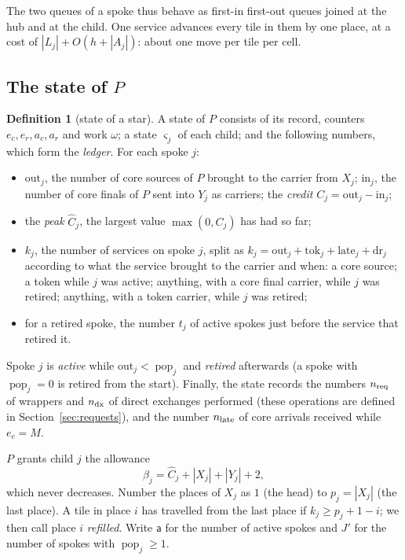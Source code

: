 \documentclass[11pt]{amsart}
\theoremstyle{definition}
\newtheorem{definition}[theorem]{Definition}
\newcommand{\pop}{\operatorname{pop}}
\begin{document}
The two queues of a spoke thus behave as first-in first-out queues joined at the hub and at the child. One service
advances every tile in them by one place, at a cost of $|L_j|+O(h+|A_j|)$: about one move per tile per cell.

\subsection{The state of $P$}

\begin{definition}[state of a star]\label{def:starstate}
A state of $P$ consists of its record, counters $e_c,e_r,a_c,a_r$ and work $\omega$; a state $\varsigma_j$ of each child; and the
following numbers, which form the \emph{ledger}. For each spoke $j$:
\begin{itemize}[nosep]
\item $\mathrm{out}_j$, the number of core sources of $P$ brought to the carrier from $X_j$; $\mathrm{in}_j$, the number of
  core finals of $P$ sent into $Y_j$ as carriers; the \emph{credit} $C_j=\mathrm{out}_j-\mathrm{in}_j$;
\item the \emph{peak} $\hat C_j$, the largest value $\max(0,C_j)$ has had so far;
\item $k_j$, the number of services on spoke $j$, split as $k_j=\mathrm{out}_j+\mathrm{tok}_j+\mathrm{late}_j+\mathrm{dr}_j$ according
  to what the service brought to the carrier and when: a core source; a token while $j$ was active; anything, with a core final
  carrier, while $j$ was retired; anything, with a token carrier, while $j$ was retired;
\item for a retired spoke, the number $t_j$ of active spokes just before the service that retired it.
\end{itemize}
Spoke $j$ is \emph{active} while $\mathrm{out}_j<\pop_j$ and \emph{retired} afterwards (a spoke with $\pop_j=0$ is retired from the
start). Finally, the state records the numbers $n_{\rm req}$ of wrappers and $n_{\rm dx}$ of direct exchanges performed (these
operations are defined in Section~\ref{sec:requests}), and the number
$n_{\rm late}$ of core arrivals received while $e_c=M$.
\end{definition}

$P$ grants child $j$ the allowance
\begin{equation}\label{eq:childbeta}
\beta_j=\hat C_j+|X_j|+|Y_j|+2 ,
\end{equation}
which never decreases. Number the places of $X_j$ as $1$ (the head) to $p_j=|X_j|$ (the last place). A tile in place $i$ has
travelled from the last place if $k_j\ge p_j+1-i$; we then call place $i$ \emph{refilled}. Write $\mathsf a$ for the number of active
spokes and $J'$ for the number of spokes with $\pop_j\ge1$.
\end{document}
